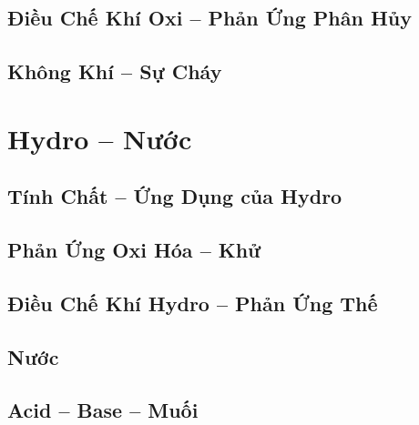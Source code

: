 \documentclass{article}
\numberwithin{equation}{section}
\begin{document}

\subsection{Điều Chế Khí Oxi -- Phản Ứng Phân Hủy}


\subsection{Không Khí -- Sự Cháy}


\section{Hydro -- Nước}

\subsection{Tính Chất -- Ứng Dụng của Hydro}


\subsection{Phản Ứng Oxi Hóa -- Khử}


\subsection{Điều Chế Khí Hydro -- Phản Ứng Thế}


\subsection{Nước}


\subsection{Acid -- Base -- Muối}
\end{document}
